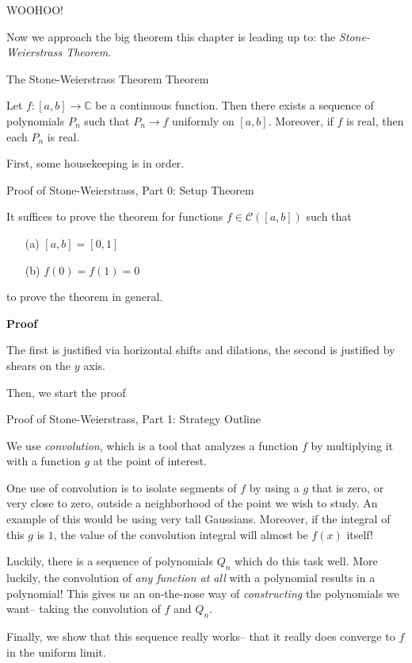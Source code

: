 WOOHOO!

Now we approach the big theorem this chapter is leading up to: the \textit{Stone-Weierstrass Theorem}.

\begin{result}
    {The Stone-Weierstrass Theorem}
    {Theorem}

    Let $f: [a, b] \to \mathbb{C}$ be a continuous function. Then there exists a sequence of polynomials $P_n$ such that $P_n \to f$ uniformly on $[a, b]$. Moreover, if $f$ is real, then each $P_n$ is real.
\end{result}

First, some housekeeping is in order.

\begin{result}
    {Proof of Stone-Weierstrass, Part 0: Setup}
    {Theorem}

    It suffices to prove the theorem for functions $f \in \mathscr{C}([a, b])$ such that 
    \begin{itemize}
        \item[(a)] $[a, b] = [0,1]$
        \item[(b)] $f(0) = f(1) = 0$
    \end{itemize}
    to prove the theorem in general.

    \textbf{Proof}

     The first is justified via horizontal shifts and dilations, the second is justified by shears on the $y$ axis. 
\end{result}

Then, we start the proof

\begin{result}
    {Proof of Stone-Weierstrass, Part 1: Strategy}
    {Outline}

    We use \textit{convolution}, which is a tool that analyzes a function $f$ by multiplying it with a function $g$ at the point of interest. 

    One use of convolution is to isolate segments of $f$ by using a $g$ that is zero, or very close to zero, outside a neighborhood of the point we wish to study. An example of this would be using very tall Gaussians. Moreover, if the integral of this $g$ is $1$, the value of the convolution integral will almost be $f(x)$ itself!

    Luckily, there is a sequence of polynomials $Q_n$ which do this task well. More luckily, the convolution of \textit{any function at all} with a polynomial results in a polynomial! This gives us an on-the-nose way of \textit{constructing} the polynomials we want-- taking the convolution of $f$ and $Q_n$.
    
    Finally, we show that this sequence really works-- that it really does converge to $f$ in the uniform limit.
\end{result}

